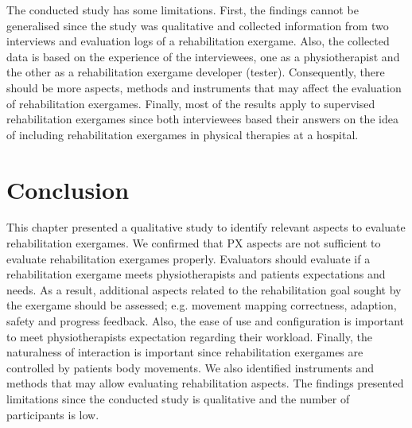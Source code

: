 The conducted study has some limitations. First, the findings cannot be generalised since the study was qualitative and collected information from two interviews and evaluation logs of a rehabilitation exergame. Also, the collected data is based on the experience of the interviewees, one as a physiotherapist and the other as a rehabilitation exergame developer (tester). Consequently, there should be more aspects, methods and instruments that may affect the evaluation of rehabilitation exergames. Finally, most of the results apply to supervised rehabilitation exergames since both interviewees based their answers on the idea of including rehabilitation exergames in physical therapies at a hospital.

\section{Conclusion} %
\label{sec:conclusion_aspects}

This chapter presented a qualitative study to identify relevant aspects to evaluate rehabilitation exergames. We confirmed that \ac{PX} aspects are not sufficient to evaluate rehabilitation exergames properly. Evaluators should evaluate if a rehabilitation exergame meets physiotherapists and patients expectations and needs. As a result, additional aspects related to the rehabilitation goal sought by the exergame should be assessed; e.g. movement mapping correctness, adaption, safety and progress feedback. Also, the ease of use and configuration is important to meet physiotherapists expectation regarding their workload. Finally, the naturalness of interaction is important since rehabilitation exergames are controlled by patients body movements. We also identified instruments and methods that may allow evaluating rehabilitation aspects. The findings presented limitations since the conducted study is qualitative and the number of participants is low.

